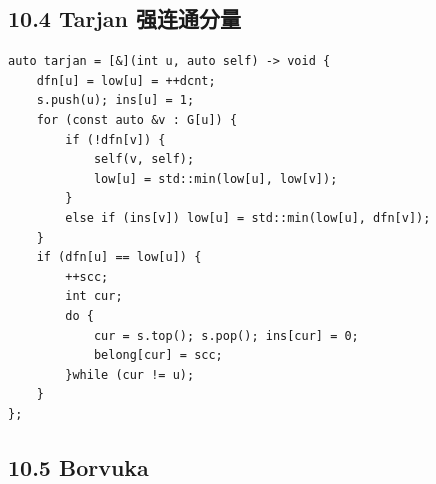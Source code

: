 \documentclass[UTF8,a4paper,11pt]{ctexart}
\begin{document}
\subsection*{10.4 Tarjan 强连通分量}

\begin{Verbatim}[fontsize=\small,frame=single,breaklines=true,breakanywhere=true]
auto tarjan = [&](int u, auto self) -> void {
    dfn[u] = low[u] = ++dcnt;
    s.push(u); ins[u] = 1;
    for (const auto &v : G[u]) {
        if (!dfn[v]) {
            self(v, self);
            low[u] = std::min(low[u], low[v]);
        }
        else if (ins[v]) low[u] = std::min(low[u], dfn[v]);
    }
    if (dfn[u] == low[u]) {
        ++scc;
        int cur;
        do {
            cur = s.top(); s.pop(); ins[cur] = 0;
            belong[cur] = scc;
        }while (cur != u);
    }
};
\end{Verbatim}
\subsection*{10.5 Borvuka}
\end{document}
